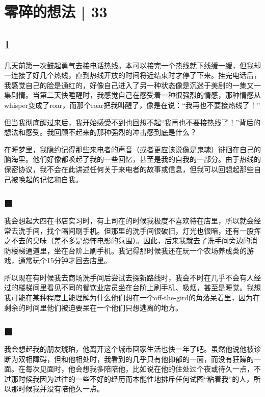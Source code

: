 \chapter{零碎的想法 | 33}




\section*{1}

几天前第一次鼓起勇气去接电话热线。本可以接完一个热线就下线缓一缓，但我却一连接了好几个热线，直到热线开放的时间将近结束时才停了下来。挂完电话后，我感觉自己的脸是通红的，好像自己进入了另一种状态\pozhehao{}像是沉迷于美剧的一集又一集剧情。当第二天快睡醒时，我感觉自己在感受着一种很强烈的情感，那种情感从whisper变成了roar，而那个roar把我叫醒了，像是在说：“我再也不要接热线了！”

但当我彻底醒过来后，我开始感受不到也回想不起“我再也不要接热线了！”背后的想法和感受。我回顾不起来的那种强烈的冲击感到底是什么？

在睡梦里，我隐约记得那些来电者的声音（或者更应该说像是鬼魂）徘徊在自己的脑海里。他们好像都唤起了我的一些回忆，甚至是我的自我的一部分。由于热线的保密协议，我不会在此讲述任何关于来电者的故事或信息，但我可以回想起那些自己被唤起的记忆和自我。

\section*{$\blacksquare$}

我会想起大四在书店实习时，有上司在的时候我极度不喜欢待在店里，所以就会经常去洗手间，找个隔间刷手机。但那里的洗手间很破旧，灯光也很暗，还有一股挥之不去的臭味（差不多是恐怖电影的氛围）。因此，后来我就去了洗手间旁边的消防楼梯通道里，坐在台阶上刷手机。我记得那时候我还在玩一个农场养成类的游戏，通常玩个15分钟才回去店里。

所以现在有时候我去商场洗手间后尝试去探新路线时，我会不时在几乎不会有人经过的楼梯间里看见不同的餐饮业店员坐在台阶上刷手机、吸烟，甚至是睡觉。我想我可能在某种程度上能理解为什么他们想在一个off-the-gird的角落呆着里，因为在剩余的时间里他们被迫要呆在一个他们只想逃离的地方。

\section*{$\blacksquare$}

我会想起我的朋友琥珀，他离开这个城市回家生活也快一年了吧。虽然他说他被诊断为双相障碍，但和他相处时，我看到的几乎只有他抑郁的一面，而没有狂躁的一面。在每次见面时，他会想我多陪陪他，比如说在他的住处过个夜或待久一点，不过那时候我因为过往的一些不好的经历而本能性地排斥任何试图“粘着我”的人，所以那时候我并没有陪他久一点。


